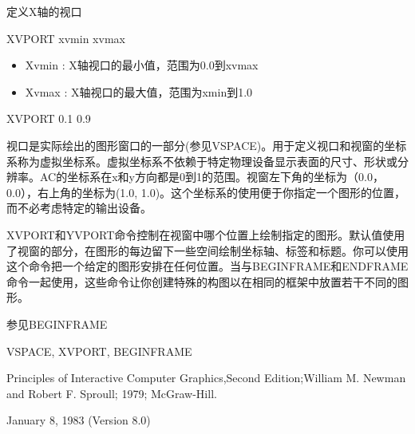 \label{cmd:xvport}

定义X轴的视口

XVPORT xvmin xvmax

\begin{itemize}
\item Xvmin : X轴视口的最小值，范围为0.0到xvmax 
\item Xvmax : X轴视口的最大值，范围为xmin到1.0 
\end{itemize}

XVPORT 0.1 0.9

视口是实际绘出的图形窗口的一部分(参见VSPACE)。用于定义视口和视窗的坐标系称为虚拟坐标系。虚拟坐标系不依赖于特定物理设备显示表面的尺寸、形状或分辨率。AC的坐标系在x和y方向都是0到1的范围。视窗左下角的坐标为（0.0，0.0），右上角的坐标为(1.0, 1.0)。这个坐标系的使用便于你指定一个图形的位置，而不必考虑特定的输出设备。

XVPORT和YVPORT命令控制在视窗中哪个位置上绘制指定的图形。默认值使用了视窗的部分，在图形的每边留下一些空间绘制坐标轴、标签和标题。你可以使用这个命令把一个给定的图形安排在任何位置。当与BEGINFRAME和ENDFRAME命令一起使用，这些命令让你创建特殊的构图以在相同的框架中放置若干不同的图形。

参见BEGINFRAME

VSPACE, XVPORT, BEGINFRAME

Principles of Interactive Computer Graphics,Second Edition;William M. Newman and Robert F. Sproull; 1979; McGraw-Hill.

January 8, 1983 (Version 8.0)

